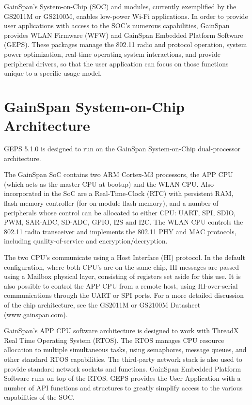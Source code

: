 GainSpan's System-\/on-\/Chip (SOC) and modules, currently exemplified by the GS2011M or GS2100M, enables low-\/power Wi-\/Fi applications. In order to provide user applications with access to the SOC's numerous capabilities, GainSpan provides WLAN Firmware (WFW) and GainSpan Embedded Platform Software (GEPS). These packages manage the 802.11 radio and protocol operation, system power optimization, real-\/time operating system interactions, and provide peripheral drivers, so that the user application can focus on those functions unique to a specific usage model.\hypertarget{main_mainpage-SOC-architecture}{}\section{GainSpan System-\/on-\/Chip Architecture}\label{main_mainpage-SOC-architecture}
GEPS 5.1.0 is designed to run on the GainSpan System-\/on-\/Chip dual-\/processor architecture.



The GainSpan SoC contains two ARM Cortex-\/M3 processors, the APP CPU (which acts as the master CPU at bootup) and the WLAN CPU. Also incorporated in the SoC are a Real-\/Time-\/Clock (RTC) with persistent RAM, flash memory controller (for on-\/module flash memory), and a number of peripherals whose control can be allocated to either CPU: UART, SPI, SDIO, PWM, SAR-\/ADC, SD-\/ADC, GPIO, I2S and I2C. The WLAN CPU controls the 802.11 radio transceiver and implements the 802.11 PHY and MAC protocols, including quality-\/of-\/service and encryption/decryption.

The two CPU's communicate using a Host Interface (HI) protocol. In the default configuration, where both CPU's are on the same chip, HI messages are passed using a Mailbox physical layer, consisting of registers set aside for this use. It is also possible to control the APP CPU from a remote host, using HI-\/over-\/serial communications through the UART or SPI ports. For a more detailed discussion of the chip architecture, see the GS2011M or GS2100M Datasheet (www.gainspan.com).

GainSpan's APP CPU software architecture is designed to work with ThreadX Real Time Operating System (RTOS). The RTOS manages CPU resource allocation to multiple simultaneous tasks, using semaphores, message queues, and other standard RTOS capabilities. The third-\/party network stack is also used to provide standard network sockets and functions. GainSpan Embedded Platform Software runs on top of the RTOS. GEPS provides the User Application with a number of API functions and structures to greatly simplify access to the various capabilities of the SOC.



